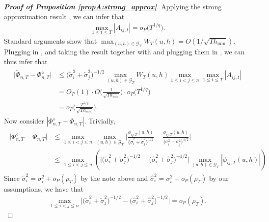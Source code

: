 \documentclass[a4paper,12pt]{article}
\makeatletter
\renewcommand{\eqref}[1]{\tagform@{\ref{#1}}}
\makeatother
\begin{document}
\begin{proof}[\textnormal{\textbf{Proof of Proposition \ref{propA:strong_approx}}}]
Applying the strong approximation result \eqref{eq-strongapprox-dep}, we can infer that
\begin{align}\label{max_At}
\max_{1 \le t \le T} |A_{ij, t}|  =o_P\big(T^{1/q}\big). 
\end{align}
Standard arguments show that $\max_{(u,h) \in \mathcal{G}_T} W_T(u,h) = O( 1/\sqrt{Th_{\min}} )$. Plugging \eqref{max_At} in \eqref{eq-strongapprox-bound3}, and taking the result together with \eqref{eqA:strong_approx:bound3} and plugging them in \eqref{eqA:strong_approx:bound2}, we can thus infer that 
\begin{align}\label{eq-strongapprox-bound4}
\begin{split}
\big| \widetilde{\Phi}_{n, T} - \Phi_{n, T}^{\diamond} \big| &\le \big(\widetilde{\sigma}_i^2 + \widetilde{\sigma}_j^2 \big)^{-1/2}  \max_{(u,h) \in \mathcal{G}_T} W_T(u, h) \max_{1\le i < j \le n}\max_{1\le t \le T} |A_{ij, t}|\\
& = O_P(1) \cdot O\Big(\frac{1}{\sqrt{Th_{\min}}} \Big) \cdot o_P\big(T^{1/q}\big)\\
&= o_P\Big( \frac{T^{1/q}}{\sqrt{Th_{\min}}} \Big).
\end{split}
\end{align}
Now consider $|\Phi_{n, T}^{\diamond} - \Phi_{n, T}|$. Trivially,
\begin{align}\label{eqA:strong_approx:bound5}
\begin{split}
\big| \Phi_{n, T}^{\diamond} - \Phi_{n, T} \big| &\le \max_{1\leq i< j \leq n}\max_{(u,h) \in \mathcal{G}_T} \Big|\frac{\phi_{ij, T}(u,h)}{\{\widetilde{\sigma}_i^2 + \widetilde{\sigma}_j^2 \}^{1/2}} - \frac{\phi_{ij, T}(u,h)}{\{{\sigma}_i^2 + {\sigma}_j^2 \}^{1/2}}\Big|\\
&\le\max_{1 \le i < j \le n} \left( \Big|\big(\widetilde{\sigma}_i^2 + \widetilde{\sigma}_j^2 \big)^{-1/2} - \big(\widehat{\sigma}_i^2 + \widehat{\sigma}_j^2 \big)^{-1/2}\Big| \max_{(u,h) \in \mathcal{G}_T} \left|\phi_{ij,T}(u,h)\right|\right)
\end{split}
\end{align}
Since $\widetilde{\sigma}_i^2 = \sigma_i^2 + o_P(\rho_T)$ by the note above and $\widehat{\sigma}_i^2 = \sigma_i^2 + o_P(\rho_T)$ by our assumptions, we have that 
\begin{align}\label{eqA:strong_approx:bound6}
\max_{1 \le i < j \le n} \Big|\big(\widetilde{\sigma}_i^2 + \widetilde{\sigma}_j^2 \big)^{-1/2} - \big(\widehat{\sigma}_i^2 + \widehat{\sigma}_j^2 \big)^{-1/2}\Big| = o_P(\rho_T).
\end{align}

\end{proof}
\end{document}
